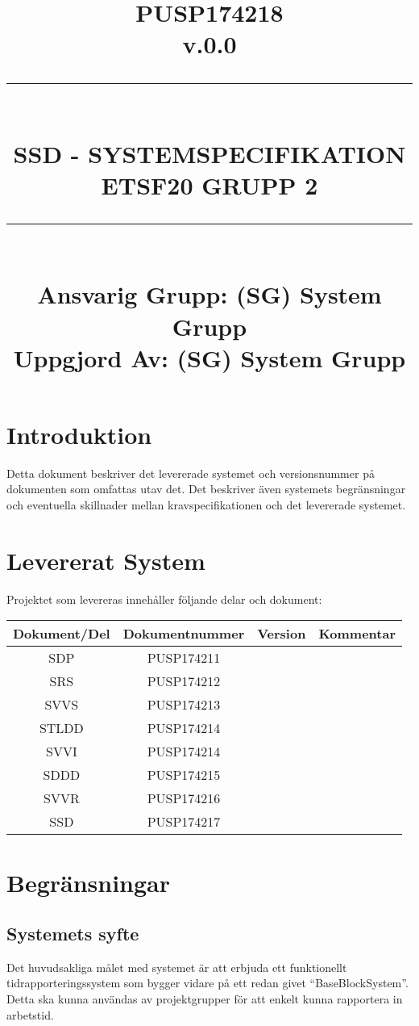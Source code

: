 \documentclass[paper=a4, fontsize=11pt,twoside]{article}
\title{
		\documentNumber{#1}																						
		\documentVersion{#2}																				
		\HRule{0.5pt} \\ %
		\LARGE \textbf{\uppercase{#3}} \\
		\large \textbf{\uppercase{ETSF20 Grupp 2}} 
		\HRule{2pt} \\ [1.5cm]    
		\normalsize            
		\documentResponsible{#4} \\ 
		\documentCreator{#4}  
	}
\newcommand{\HRule}[1]{\rule{\linewidth}{#1}}
\newcommand{\documentNumber}[1]{\centering PUSP1742#1 \\[1.0cm]}
\newcommand{\documentVersion}[1]{\centering \small{v.#1} \\[1.0cm]}
\newcommand{\documentResponsible}[1]{\centering  Ansvarig Grupp: #1}
\newcommand{\documentCreator}[1]{\centering Uppgjord Av: #1}
\newcommand{\grouptitlepage}[4]{ 
	\title{
		\documentNumber{#1}																						
		\documentVersion{#2}																				
		\HRule{0.5pt} \\ %
		\LARGE \textbf{\uppercase{#3}} \\
		\large \textbf{\uppercase{ETSF20 Grupp 2}} 
		\HRule{2pt} \\ [1.5cm]    
		\normalsize            
		\documentResponsible{#4} \\ 
		\documentCreator{#4}  
	}																							
	\maketitle																							
	\thispagestyle{empty} 																					
	\newpage 
}
\begin{document}
\grouptitlepage
{18}
{0.0}
{SSD - Systemspecifikation}
{(SG) System Grupp}
\tableofcontents
\newpage
\section{Introduktion}
Detta dokument beskriver det levererade systemet och versionsnummer på dokumenten som omfattas utav det. Det beskriver även systemets begränsningar och eventuella skillnader mellan kravspecifikationen och det levererade systemet.

\section{Levererat System}
Projektet som levereras innehåller följande delar och dokument:
\begin{center}
\begin{tabular}{|c|c|c|c|}
	\hline	
	Dokument/Del & Dokumentnummer & Version & Kommentar \\
	\hline	
	SDP & PUSP174211 & & \\
	\hline
	SRS & PUSP174212 & & \\
	\hline
	SVVS & PUSP174213 & & \\
	\hline
	STLDD & PUSP174214 & & \\
	\hline
	SVVI & PUSP174214 & & \\
	\hline
	SDDD & PUSP174215 & & \\
	\hline
	SVVR & PUSP174216 & & \\
	\hline
	SSD & PUSP174217 & & \\
	\hline
\end{tabular}
\end{center}
\section{Begränsningar}
\subsection{Systemets syfte}
Det huvudsakliga målet med systemet är att erbjuda ett funktionellt tidrapporteringssystem som bygger vidare på ett redan givet “BaseBlockSystem”. Detta ska kunna användas av projektgrupper för att enkelt kunna rapportera in arbetstid.
\end{document}

